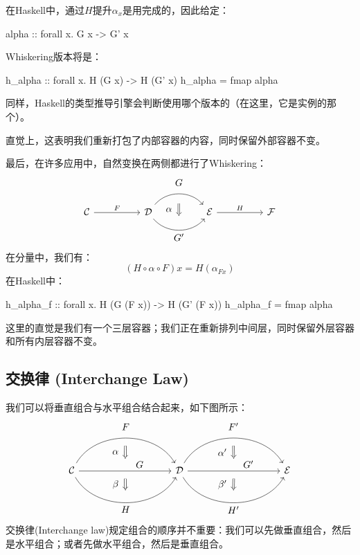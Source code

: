 \documentclass[DaoFP]{subfiles}
\begin{document}
    在Haskell中，通过$H$提升$\alpha_x$是用完成的，因此给定：
    \begin{haskell}
        alpha :: forall x. G x -> G' x
    \end{haskell}
    Whiskering版本将是：
    \begin{haskell}
        h_alpha :: forall x. H (G x) -> H (G' x)
        h_alpha = fmap alpha
    \end{haskell}
    同样，Haskell的类型推导引擎会判断使用哪个版本的（在这里，它是实例的那个）。

    直觉上，这表明我们重新打包了内部容器的内容，同时保留外部容器不变。

    最后，在许多应用中，自然变换在两侧都进行了Whiskering：
    \[
        \begin{tikzcd}[column sep=huge]
            \mathcal{C}
            \arrow[r, "F"]
            &
            \mathcal{D}
            \arrow[bend left=50]{r}[name=U1, label=above:$G$]{}
            \arrow[bend right=50]{r}[name=D1, label=below:$G'$]{}
            &
            \mathcal{E}
            \arrow[shorten <=10pt,shorten >=10pt,Rightarrow,to path={(U1) -- node[label=left:$\alpha$] {} (D1)}]{}
            \arrow[r, "H"]
            &
            \mathcal{F}
        \end{tikzcd}
    \]
    在分量中，我们有：
    \[ (H \circ \alpha \circ F) x = H (\alpha_{F x})\]
    在Haskell中：
    \begin{haskell}
        h_alpha_f :: forall x. H (G (F x)) -> H (G' (F x))
        h_alpha_f = fmap alpha
    \end{haskell}

    这里的直觉是我们有一个三层容器；我们正在重新排列中间层，同时保留外层容器和所有内层容器不变。

    \subsection{交换律 (Interchange Law)}

    我们可以将垂直组合与水平组合结合起来，如下图所示：
    \[
        \begin{tikzcd}[column sep=huge]
            \mathcal{C}
            \arrow[bend left=60]{rr}[name=U, label=above:$F$]{}
            \arrow[]{rr}[name=M, label={[xshift=15pt, yshift=-5pt]:$G$}]{}
            \arrow[bend right=60]{rr}[name=D, label=below:$H$]{}
            &&
            \mathcal{D}
            \arrow[bend left=60]{rr}[name=U1, label=above:$F'$]{}
            \arrow[]{rr}[name=M1, label={[xshift=15pt, yshift=-5pt]:$G'$}]{}
            \arrow[bend right=60]{rr}[name=D1, label=below:$H'$]{}
            &&
            \mathcal{E}
            \arrow[shorten <=8pt, shorten >=8pt,Rightarrow, to path={(U) -- node[label=left:$\alpha$] {} (M)}]{}
            \arrow[shorten <=8pt, shorten >=8pt,Rightarrow, to path={(M) -- node[label=left:$\beta$] {} (D)}]{}
            \arrow[shorten <=8pt, shorten >=8pt,Rightarrow, to path={(U1) -- node[label=left:$\alpha'$] {} (M1)}]{}
            \arrow[shorten <=8pt, shorten >=8pt,Rightarrow, to path={(M1) -- node[label=left:$\beta'$] {} (D1)}]{}
        \end{tikzcd}
    \]
    交换律(Interchange law)规定组合的顺序并不重要：我们可以先做垂直组合，然后是水平组合；或者先做水平组合，然后是垂直组合。
\end{document}
